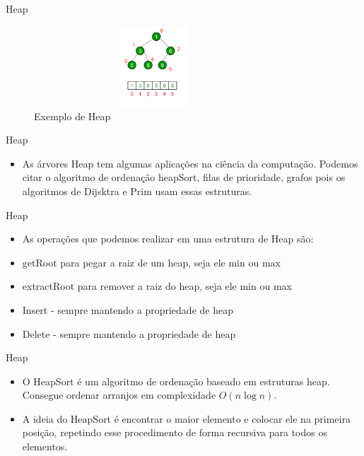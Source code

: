 \begin{frame}
	\begin{block}{Heap}
		\begin{figure}[!htb]
			\centering	  				
			\includegraphics[height=3cm, width = 9cm]{./pic/binaryheap.png}
			\caption{Exemplo de Heap}
			\label{fig_pilha}
		\end{figure}
	\end{block}
\end{frame}


\begin{frame}
	\begin{block}{Heap}
		\begin{itemize}
			\item As árvores Heap tem algumas aplicações na ciência da computação. Podemos citar o algoritmo de ordenação heapSort, filas de prioridade, grafos pois os algoritmos de Dijsktra e Prim usam essas estruturas.
		\end{itemize}
	\end{block}
\end{frame}


\begin{frame}
	\begin{block}{Heap}
		\begin{itemize}
			\item As operações que podemos realizar em uma estrutura de Heap são:
			\item getRoot para pegar a raiz de um heap, seja ele min ou max
			\item extractRoot para remover a raiz do heap, seja ele min ou max
			\item Insert - sempre mantendo a propriedade de heap 
			\item Delete - sempre mantendo a propriedade de heap 
		\end{itemize}
	\end{block}
\end{frame}

\begin{frame}
	\begin{block}{Heap}
		\begin{itemize}
			\item O HeapSort é um algoritmo de ordenação baseado em estruturas heap. Consegue ordenar arranjos em complexidade $O(n \log n)$.

			\item A ideia do HeapSort é encontrar o maior elemento e colocar ele na primeira posição, repetindo esse procedimento de forma recursiva para todos os elementos.
		\end{itemize}
	\end{block}
\end{frame}

